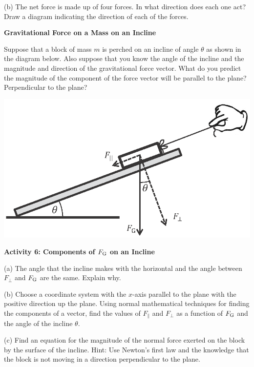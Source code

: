 (b) The net force is made up of four forces.  
In what direction does each one act? Draw a
diagram indicating the direction of each of the forces.
\answerspace{20mm}

\pagebreak[2]
\textbf{Gravitational Force on a Mass on an Incline }

Suppose that a block of mass $m$ is perched on an incline of angle \( \theta  \)
as shown in the diagram below. Also suppose that you know the angle of the incline
and the magnitude and direction of the gravitational force vector. What do you
predict the magnitude of the component of the force vector will be parallel
to the plane? Perpendicular to the plane?

\vspace{0.3cm}
{\par\centering \includegraphics{newton/newton_fig10_new.eps} \par}
\vspace{0.3cm}

\textbf{Activity 6: Components of $F_{\rm G}$ on an Incline }

(a) The angle that the incline makes with the horizontal and the angle between
\( {F}_{{\perp}} \) and \(F_{\rm G} \) are the same. Explain why.
\vspace{20mm}

(b) Choose a coordinate system with the $x$-axis parallel to the plane with the
positive direction up the plane. Using normal mathematical techniques for finding the components of a vector, find the values of 
\( F_{\parallel} \) and \( F_{\perp} \)
as a function of \( F_{\rm G} \) and the angle of the incline \( \theta  \).
\vspace{20mm}

(c) Find an equation for the magnitude of the normal force exerted on the
block by the surface of the incline. Hint: Use Newton's first law and the knowledge that the block is not moving in a direction perpendicular to the plane.


